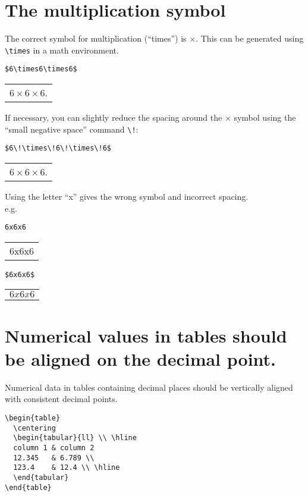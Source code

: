 \documentclass[a4paper]{tufte-handout}
\begin{document}
\section{The multiplication symbol}
The correct symbol for multiplication (``times'') is $\times$. This can be generated using \lstinline{\times} in a math environment. 
\begin{lstlisting}
$6\times6\times6$
\end{lstlisting}
\begin{tabular}{|p{10cm}}
$6\times6\times6$.
\end{tabular}

If necessary, you can slightly reduce the spacing around the $\times$ symbol using the ``small negative space'' command \lstinline{\!}:
\begin{lstlisting}
$6\!\times\!6\!\times\!6$
\end{lstlisting}
\begin{tabular}{|p{10cm}}
$6\!\times\!6\!\times\!6$.
\end{tabular}

Using the letter ``x'' gives the wrong symbol and incorrect spacing.\\ 
e.g.
\begin{lstlisting}
6x6x6
\end{lstlisting}
\begin{tabular}{|p{10cm}}
6x6x6
\end{tabular}

\begin{lstlisting}
$6x6x6$
\end{lstlisting}
\begin{tabular}{|p{10cm}}
$6x6x6$
\end{tabular}

\section{Numerical values in tables should be aligned on the decimal point.}
Numerical data in tables containing decimal places should be vertically aligned with consistent decimal points.
\begin{lstlisting}
\begin{table}
  \centering
  \begin{tabular}{ll} \\ \hline
  column 1 & column 2
  12.345   & 6.789 \\
  123.4    & 12.4 \\ \hline
  \end{tabular}
\end{table}
\end{lstlisting}
\end{document}
